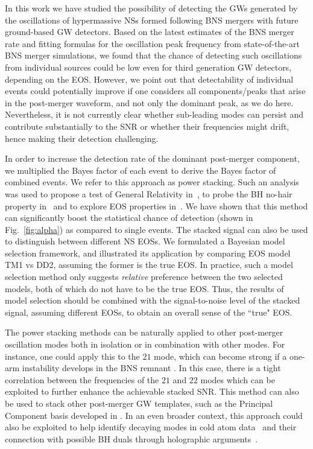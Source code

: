 \documentclass[prd,aps,floatfix,superscriptaddress,nofootinbib,twocolumn,10pt,English]{revtex4-1}
\begin{document}
In this work we have studied the possibility of detecting the GWs
generated by the oscillations of hypermassive NSs formed following BNS
mergers with future ground-based GW detectors. Based on the latest
estimates of the BNS merger rate and fitting formulas for the
oscillation peak frequency from state-of-the-art BNS merger
simulations, we found that the chance of detecting such oscillations
from individual sources could be low even for third generation GW
detectors, depending on the EOS. However, we point out that
detectability of individual events could potentially improve if one
considers all components/peaks that arise in the post-merger waveform,
and not only the dominant peak, as we do here. Nevertheless, it is not
currently clear whether sub-leading modes can persist and contribute
substantially to the SNR or whether their frequencies might drift,
hence making their detection challenging.

In order to increase the detection rate of the dominant post-merger
component, we 
 multiplied the Bayes factor
of each event to derive the Bayes factor of combined events. We refer
to this approach as power stacking.  Such an analysis was used to
propose a test of General Relativity in~\cite{Agathos:2013upa}, to
probe the BH no-hair property in~\cite{PhysRevD.90.064009} and to
explore EOS properties in~\cite{Agathos:2015uaa}. We have shown that this method can significantly 
boost the statistical chance of detection (shown in Fig.~\ref{fig:alpha}) as compared
to single events. The stacked signal can also be used to distinguish between
different NS EOSs. We formulated a Bayesian  model
selection framework, and illustrated its application by comparing EOS
model TM1 vs DD2, assuming the former is the true EOS. In practice,
such a model selection method only suggests {\it relative} preference
between the two selected models, both of which do not have to be the
true EOS. Thus, the results of model selection should be combined with
the signal-to-noise level of the stacked signal, assuming different
EOSs, to obtain an overall sense of the ``true" EOS.

The power stacking methods can be naturally applied to other
post-merger oscillation modes both in isolation or in combination with
other modes. For instance, one could apply this to the $21$ mode, which can become
strong if a one-arm instability develops in the BNS remnant
\cite{Paschalidis:2015mla,East:2015vix,East:2016zvv,Lehner:2016wjg}.
In this case, there is a tight correlation between the frequencies of the
$21$ and $22$ modes which can be exploited to further enhance the
achievable stacked SNR. This method can also be used to stack other post-merger
GW templates, such as the Principal Component basis
developed in \cite{clark2016observing}.  In an even broader context,
this approach could also be exploited to help identify decaying modes
in cold atom data~\cite{PhysRevLett.94.170404,Cao:2010wa} and their
connection with possible BH  duals through holographic
arguments~\cite{Brewer:2015ipa,Bantilan:2016qos}.
\end{document}
